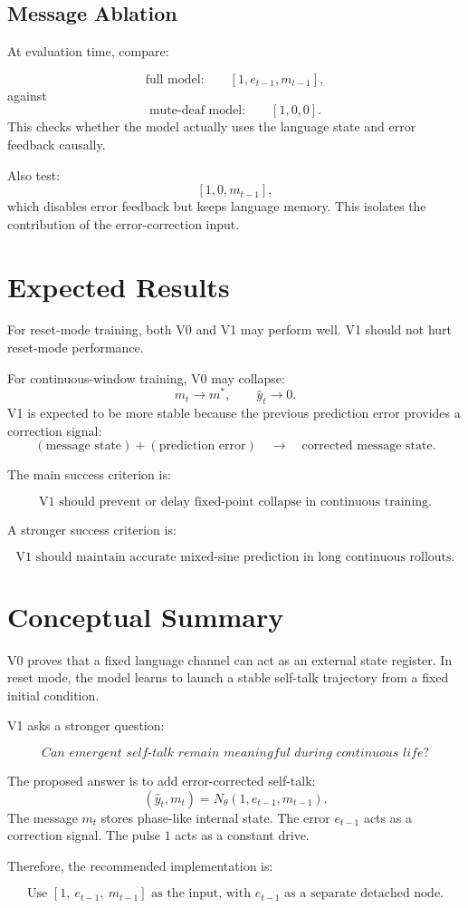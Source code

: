 \documentclass[11pt]{article}
\begin{document}
\subsection{Message Ablation}

At evaluation time, compare:

\[
\text{full model:}
\qquad
[1,e_{t-1},m_{t-1}],
\]
against
\[
\text{mute-deaf model:}
\qquad
[1,0,0].
\]
This checks whether the model actually uses the language state and error feedback causally.

Also test:
\[
[1,0,m_{t-1}],
\]
which disables error feedback but keeps language memory. This isolates the contribution of the error-correction input.

\section{Expected Results}

For reset-mode training, both V0 and V1 may perform well. V1 should not hurt reset-mode performance.

For continuous-window training, V0 may collapse:
\[
m_t \to m^*,
\qquad
\hat y_t \to 0.
\]
V1 is expected to be more stable because the previous prediction error provides a correction signal:
\[
(\text{message state}) + (\text{prediction error})
\quad\longrightarrow\quad
\text{corrected message state}.
\]

The main success criterion is:

\[
\boxed{
\text{V1 should prevent or delay fixed-point collapse in continuous training.}
}
\]

A stronger success criterion is:

\[
\boxed{
\text{V1 should maintain accurate mixed-sine prediction in long continuous rollouts.}
}
\]

\section{Conceptual Summary}

V0 proves that a fixed language channel can act as an external state register. In reset mode, the model learns to launch a stable self-talk trajectory from a fixed initial condition.

V1 asks a stronger question:

\[
\textit{Can emergent self-talk remain meaningful during continuous life?}
\]

The proposed answer is to add error-corrected self-talk:
\[
(\hat y_t,m_t)=N_\theta(1,e_{t-1},m_{t-1}).
\]
The message $m_t$ stores phase-like internal state. The error $e_{t-1}$ acts as a correction signal. The pulse $1$ acts as a constant drive.

Therefore, the recommended implementation is:

\[
\boxed{
\text{Use }[1,\ e_{t-1},\ m_{t-1}]
\text{ as the input, with }e_{t-1}\text{ as a separate detached node.}
}
\]
\end{document}
